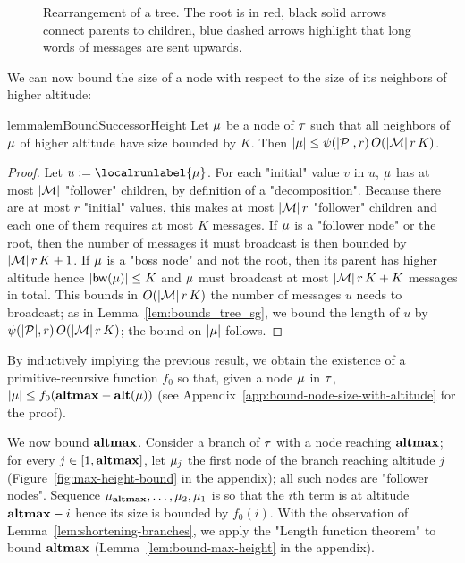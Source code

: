 \begin{figure}[t]
	
	\caption{Rearrangement of a tree. The root is in red, black solid arrows connect parents to children, blue dashed arrows highlight that long words of messages are sent upwards.}
	\label{fig:rearrange-tree}
\end{figure}

We can now bound the size of a node with respect to the size of its neighbors of higher altitude:

\begin{restatable}{lemma}{lemBoundSuccessorHeight}
	\label{lem:bound-successor-height}
	Let $\mu$ be a node of $\tau$ such that all neighbors of $\mu$ of higher altitude have size bounded by $K$.
	Then $|\mu| \leq \psi(|\mathcal{P}|, r) \, O(|\mathcal{M}| \, r \, K)$. 
\end{restatable}
\begin{proof}
	Let $u := \localrunlabel{\node}$. For each "initial" value $v$ in $u$, $\mu$ has at most $|\mathcal{M}|$ "follower" children, by definition of a "decomposition".
	Because there are at most $r$ "initial" values, this makes at most $|\mathcal{M}| \, r$ "follower" children and each one of them requires at most $K$ messages. If $\mu$ is a "follower node" or the root, then the number of messages it must broadcast is then bounded by $|\mathcal{M}| \, r \, K +1$. If $\mu$ is a "boss node" and not the root, then its parent %
	has higher altitude hence $|\mathsf{bw}(\mu)| \leq K$ and $\mu$ must broadcast at most $|\mathcal{M}| \, r \, K + K$ messages in total.
	This bounds in $O(|\mathcal{M}| \, r \, K) $ the number of messages $u$ needs to broadcast; as in Lemma~\ref{lem:bounds_tree_sg}, we bound the length of $u$ by $\psi(|\mathcal{P}|,r) \, O(|\mathcal{M}|\, r \, K)$; the bound on $|\mu|$ follows.
\end{proof}


By inductively implying the previous result, we obtain the existence of a primitive-recursive function $f_0$ so that, given a node $\mu$ in $\tau$, $|\mu| \leq f_0(\mathbf{altmax} - \mathbf{alt}(\mu))$ (see Appendix~\ref{app:bound-node-size-with-altitude} for the proof).

We now bound $\mathbf{altmax}$. Consider a branch of $\tau$ with a node reaching $\mathbf{altmax}$; for every $j \in [1,\mathbf{altmax}]$, let $\mu_{j}$ the first node of the branch reaching altitude $j$ (Figure~\ref{fig:max-height-bound} in the appendix); all such nodes are "follower nodes". Sequence $\mu_{\mathbf{altmax}}, \dots, \mu_2, \mu_1$ is so that the $i$th term is at altitude $\mathbf{altmax}-i$ hence its size is bounded by $f_0(i)$. With the observation of Lemma~\ref{lem:shortening-branches}, we apply the "Length function theorem" to bound $\mathbf{altmax}$ (Lemma~\ref{lem:bound-max-height} in the appendix).


